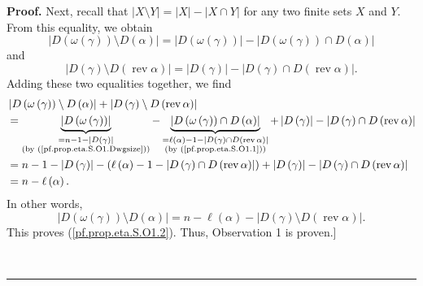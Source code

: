 \documentclass[numbers=enddot,12pt,final,onecolumn,notitlepage]{scrartcl}%
\theoremstyle{definition}
\newenvironment{proof}[1][Proof]{\noindent\textbf{#1.} }{\ \rule{0.5em}{0.5em}}
\newenvironment{noncompile}{}{}
\begin{document}
\begin{proof}
\begin{noncompile}
Next, recall that $\left\vert X\setminus Y\right\vert =\left\vert X\right\vert
-\left\vert X\cap Y\right\vert $ for any two finite sets $X$ and $Y$. From
this equality, we obtain%
\begin{equation}
\left\vert D\left(  \omega\left(  \gamma\right)  \right)  \setminus D\left(
\alpha\right)  \right\vert =\left\vert D\left(  \omega\left(  \gamma\right)
\right)  \right\vert -\left\vert D\left(  \omega\left(  \gamma\right)
\right)  \cap D\left(  \alpha\right)  \right\vert \label{pf.prop.eta.S.O1.b1}%
\end{equation}
and%
\begin{equation}
\left\vert D\left(  \gamma\right)  \setminus D\left(  \operatorname*{rev}%
\alpha\right)  \right\vert =\left\vert D\left(  \gamma\right)  \right\vert
-\left\vert D\left(  \gamma\right)  \cap D\left(  \operatorname*{rev}%
\alpha\right)  \right\vert . \label{pf.prop.eta.S.O1.b2}%
\end{equation}
Adding these two equalities together, we find%
\begin{align*}
&  \left\vert D\left(  \omega\left(  \gamma\right)  \right)  \setminus
D\left(  \alpha\right)  \right\vert +\left\vert D\left(  \gamma\right)
\setminus D\left(  \operatorname*{rev}\alpha\right)  \right\vert \\
&  =\underbrace{\left\vert D\left(  \omega\left(  \gamma\right)  \right)
\right\vert }_{\substack{=n-1-\left\vert D\left(  \gamma\right)  \right\vert
\\\text{(by (\ref{pf.prop.eta.S.O1.Dwgsize}))}}}-\underbrace{\left\vert
D\left(  \omega\left(  \gamma\right)  \right)  \cap D\left(  \alpha\right)
\right\vert }_{\substack{=\ell\left(  \alpha\right)  -1-\left\vert D\left(
\gamma\right)  \cap D\left(  \operatorname*{rev}\alpha\right)  \right\vert
\\\text{(by (\ref{pf.prop.eta.S.O1.1}))}}}+\left\vert D\left(  \gamma\right)
\right\vert -\left\vert D\left(  \gamma\right)  \cap D\left(
\operatorname*{rev}\alpha\right)  \right\vert \\
&  =n-1-\left\vert D\left(  \gamma\right)  \right\vert -\left(  \ell\left(
\alpha\right)  -1-\left\vert D\left(  \gamma\right)  \cap D\left(
\operatorname*{rev}\alpha\right)  \right\vert \right)  +\left\vert D\left(
\gamma\right)  \right\vert -\left\vert D\left(  \gamma\right)  \cap D\left(
\operatorname*{rev}\alpha\right)  \right\vert \\
&  =n-\ell\left(  \alpha\right)  .
\end{align*}
In other words,%
\[
\left\vert D\left(  \omega\left(  \gamma\right)  \right)  \setminus D\left(
\alpha\right)  \right\vert =n-\ell\left(  \alpha\right)  -\left\vert D\left(
\gamma\right)  \setminus D\left(  \operatorname*{rev}\alpha\right)
\right\vert .
\]
This proves (\ref{pf.prop.eta.S.O1.2}). Thus, Observation 1 is proven.]
\medskip
\end{noncompile}


\end{proof}
\end{document}
